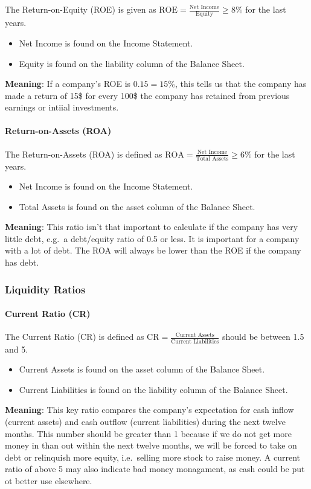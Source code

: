 The Return-on-Equity (ROE) is given as
$\text{ROE} = \frac{\text{Net Income}}{\text{Equity}} \geq 8\%$ for the last years.
\begin{itemize}
    \item Net Income is found on the Income Statement.
    \item Equity is found on the liability column of the Balance Sheet.
\end{itemize}
\textbf{Meaning}: If a company's ROE is $0.15 = 15\%$, this tells us that the company
has made a return of 15\$ for every 100\$ the company has retained from previous
earnings or intiial investments.

\paragraph{Return-on-Assets (ROA)}

The Return-on-Assets (ROA) is defined as
$\text{ROA} = \frac{\text{Net Income}}{\text{Total Assets}} \geq 6\%$ for the last years.
\begin{itemize}
    \item Net Income is found on the Income Statement.
    \item Total Assets is found on the asset column of the Balance Sheet.
\end{itemize}
\textbf{Meaning}: This ratio isn't that important to calculate if the company has 
very little debt, e.g.\ a debt/equity ratio of 0.5 or less. It is important for 
a company with a lot of debt. The ROA will always be lower than the ROE if the 
company has debt.

\subsubsection{Liquidity Ratios}

\paragraph{Current Ratio (CR)}

The Current Ratio (CR) is defined as
$\text{CR} = \frac{\text{Current Assets}}{\text{Current Liabilities}}$ should be
between 1.5 and 5.
\begin{itemize}
    \item Current Assets is found on the asset column of the Balance Sheet.
    \item Current Liabilities is found on the liability column of the Balance Sheet.
\end{itemize}
\textbf{Meaning}: This key ratio compares the company's expectation for cash inflow
(current assets) and cash outflow (current liabilities) during the next twelve
months. This number should be greater than 1 because if we do not get more money
in than out within the next twelve months, we will be forced to take on debt or
relinquish more equity, i.e.\ selling more stock to raise money. A current ratio
of above 5 may also indicate bad money monagament, as cash could be put ot better
use elsewhere.

